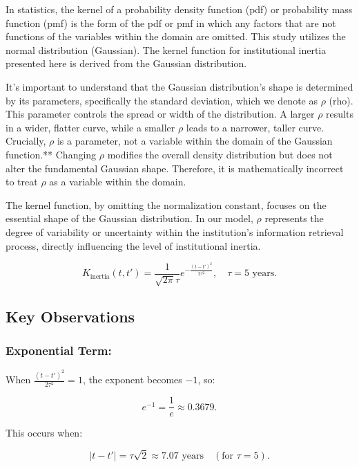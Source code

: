 \documentclass[10pt]{article}
\theoremstyle{definition}
\begin{document}
In statistics, the kernel of a probability density function (pdf) or probability mass function (pmf) is the form of the pdf or pmf in which any factors that are not functions of the variables within the domain are omitted. This study utilizes the normal distribution (Gaussian). The kernel function for institutional inertia presented here is derived from the Gaussian distribution.

It's important to understand that the Gaussian distribution's shape is determined by its parameters, specifically the standard deviation, which we denote as $\rho$ (rho). This parameter controls the spread or width of the distribution. A larger $\rho$ results in a wider, flatter curve, while a smaller $\rho$ leads to a narrower, taller curve. Crucially, $\rho$ is a parameter, not a variable within the domain of the Gaussian function.** Changing $\rho$ modifies the overall density distribution but does not alter the fundamental Gaussian shape. Therefore, it is mathematically incorrect to treat $\rho$ as a variable within the domain.

The kernel function, by omitting the normalization constant, focuses on the essential shape of the Gaussian distribution. In our model, $\rho$ represents the degree of variability or uncertainty within the institution's information retrieval process, directly influencing the level of institutional inertia.

\begin{equation}
K_{\text{inertia}}(t, t') = \frac{1}{\sqrt{2\pi}\tau} e^{-\frac{(t-t')^2}{2\tau^2}}, \quad \tau = 5 \text{ years}.
\end{equation}


\subsection{Key Observations}

\subsubsection{Exponential Term:}

When $\frac{(t-t')^2}{2\tau^2} = 1$, the exponent becomes $-1$, so:

\begin{equation}
e^{-1} = \frac{1}{e} \approx 0.3679.
\end{equation}

This occurs when:

\begin{equation}
|t - t'| = \tau\sqrt{2} \approx 7.07 \text{ years} \quad (\text{for } \tau = 5).
\end{equation}
\end{document}
